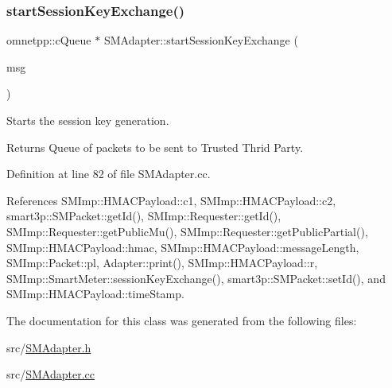 \subsubsection{\texorpdfstring{start\+Session\+Key\+Exchange()}{startSessionKeyExchange()}}
{\footnotesize\ttfamily omnetpp\+::c\+Queue $\ast$ S\+M\+Adapter\+::start\+Session\+Key\+Exchange (\begin{DoxyParamCaption}\item[{omnetpp\+::c\+Message $\ast$}]{msg }\end{DoxyParamCaption})}

Starts the session key generation. \begin{DoxyReturn}{Returns}
Queue of packets to be sent to Trusted Thrid Party. 
\end{DoxyReturn}


Definition at line 82 of file S\+M\+Adapter.\+cc.



References S\+M\+Imp\+::\+H\+M\+A\+C\+Payload\+::c1, S\+M\+Imp\+::\+H\+M\+A\+C\+Payload\+::c2, smart3p\+::\+S\+M\+Packet\+::get\+Id(), S\+M\+Imp\+::\+Requester\+::get\+Id(), S\+M\+Imp\+::\+Requester\+::get\+Public\+Mu(), S\+M\+Imp\+::\+Requester\+::get\+Public\+Partial(), S\+M\+Imp\+::\+H\+M\+A\+C\+Payload\+::hmac, S\+M\+Imp\+::\+H\+M\+A\+C\+Payload\+::message\+Length, S\+M\+Imp\+::\+Packet\+::pl, Adapter\+::print(), S\+M\+Imp\+::\+H\+M\+A\+C\+Payload\+::r, S\+M\+Imp\+::\+Smart\+Meter\+::session\+Key\+Exchange(), smart3p\+::\+S\+M\+Packet\+::set\+Id(), and S\+M\+Imp\+::\+H\+M\+A\+C\+Payload\+::time\+Stamp.



The documentation for this class was generated from the following files\+:\begin{DoxyCompactItemize}
\item 
src/\hyperlink{SMAdapter_8h}{S\+M\+Adapter.\+h}\item 
src/\hyperlink{SMAdapter_8cc}{S\+M\+Adapter.\+cc}\end{DoxyCompactItemize}
